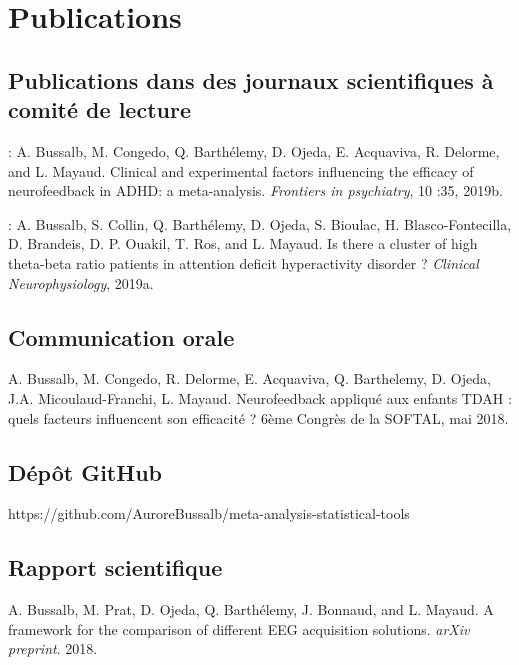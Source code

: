 \chapter*{Publications} 

\section*{Publications dans des journaux scientifiques à comité de lecture}
\begin{description}
\item \citet{Bussalb2019clinical} : A. Bussalb, M. Congedo, Q. Barthélemy, D. Ojeda, E. Acquaviva, R. Delorme,
and L. Mayaud. Clinical and experimental factors influencing the efficacy of
neurofeedback in ADHD: a meta-analysis. \textit{Frontiers in psychiatry}, 10 :35, 2019b.
\item \citet{Bussalb2019tbr} : A. Bussalb, S. Collin, Q. Barthélemy, D. Ojeda, S. Bioulac, H. Blasco-Fontecilla,
D. Brandeis, D. P. Ouakil, T. Ros, and L. Mayaud. Is there a cluster of high
theta-beta ratio patients in attention deficit hyperactivity disorder ? \textit{Clinical Neurophysiology}, 2019a.
\end{description}

\section*{Communication orale}
\begin{description}
\item A. Bussalb, M. Congedo, R. Delorme, E. Acquaviva, Q. Barthelemy, D. Ojeda, J.A. Micoulaud-Franchi, L. Mayaud. Neurofeedback 
appliqué aux enfants TDAH : quels facteurs influencent son efficacité ? 6ème Congrès de la SOFTAL, mai 2018. 
\end{description}

\section*{Dépôt GitHub}
https://github.com/AuroreBussalb/meta-analysis-statistical-tools

\newpage
\section*{Rapport scientifique}
A. Bussalb, M. Prat, D. Ojeda, Q. Barthélemy, J. Bonnaud, and L. Mayaud. A framework for the comparison of different EEG acquisition 
solutions. \textit{arXiv preprint}. 2018.